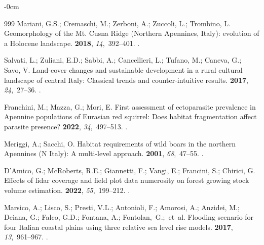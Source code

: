 \documentclass[jimaging,article,accept,pdftex,oneauthor]{Definitions/mdpi}
\begin{document}
\begin{adjustwidth}{-\extralength}{0cm}
\begin{thebibliography}{999}
Mariani, G.S.; Cremaschi, M.; Zerboni, A.; Zuccoli, L.; Trombino, L.
\newblock Geomorphology of the Mt. Cusna Ridge (Northern Apennines, Italy):
  evolution of a Holocene landscape.
 {\bf 2018}, {\em 14},~392--401.
.

Salvati, L.; Zuliani, E.D.; Sabbi, A.; Cancellieri, L.; Tufano, M.; Caneva, G.;
  Savo, V.
\newblock Land-cover changes and sustainable development in a rural cultural
  landscape of central Italy: Classical trends and counter-intuitive results.
 {\bf 2017}, {\em 24},~27--36.
.

Franchini, M.; Mazza, G.; Mori, E.
\newblock First assessment of ectoparasite prevalence in Apennine populations
  of Eurasian red squirrel: Does habitat fragmentation affect parasite
  presence?
 {\bf 2022}, {\em 34},~497--513.
.

Meriggi, A.; Sacchi, O.
\newblock Habitat requirements of wild boars in the northern Apennines (N
  Italy): A multi‐level approach.
 {\bf 2001}, {\em 68},~47--55.
.

D’Amico, G.; McRoberts, R.E.; Giannetti, F.; Vangi, E.; Francini, S.;
  Chirici, G.
\newblock Effects of lidar coverage and field plot data numerosity on forest
  growing stock volume estimation.
 {\bf 2022}, {\em
  55},~199--212.
.

Marsico, A.; Lisco, S.; Presti, V.L.; Antonioli, F.; Amorosi, A.; Anzidei, M.;
  Deiana, G.; Falco, G.D.; Fontana, A.; \mbox{Fontolan, G.;  et~al.}
\newblock Flooding scenario for four Italian coastal plains using three
  relative sea level rise models.
 {\bf 2017}, {\em 13},~961--967.
.


\end{thebibliography}
\end{adjustwidth}
\end{document}
